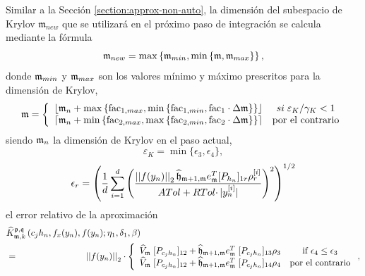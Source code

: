 Similar a la Sección \ref{section:approx-non-auto}, la dimensión del subespacio de Krylov $\mathfrak{m}_{new}$ que se utilizará en el próximo paso de integración se calcula mediante la fórmula
\begin{equation}\label{calcmnew-fj}
	\mathfrak{m}_{new}= \max\left\{ \mathfrak{m}_{min}, \min\left\{ \mathfrak{m} , \mathfrak{m}_{max}  \right\} \right\},
	\end{equation}
donde $\mathfrak{m}_{min}$ y $\mathfrak{m}_{max}$ son los valores mínimo y máximo prescritos para la dimensión de Krylov,
\begin{equation}
	\mathfrak{m} = \left\{
\begin{array}{cc}
\left\lfloor \mathfrak{m}_{n} + \max\left\{ \mathrm{fac}_{1,max} , \min\left\{ \mathrm{fac}_{1,min},
		\mathrm{fac}_1\cdot\Delta\mathfrak{m} \right\}  \right\} \right\rfloor & si \;  \varepsilon_{K}/\gamma_{K}< 1\\
\left\lceil \mathfrak{m}_{n} + \min\left\{ \mathrm{fac}_{2,max} , \max\left\{ \mathrm{fac}_{2,min},
		\mathrm{fac}_2\cdot\Delta\mathfrak{m} \right\}  \right\} \right\rceil  & \text{por el contrario}
\end{array}
\right. \label{m_unica}
\end{equation}
siendo $\mathfrak{m}_{n}$ la dimensión de Krylov  en el paso actual,
\begin{equation} \label{errrel-fj}
	\varepsilon_{K} = \min \{\epsilon _{3},\epsilon _{4}\},
	\end{equation}
	\begin{equation*}
	\epsilon_{r} = \left(\frac{1}{d}\sum\limits_{i=1}^{d} \left(\frac{\left\lvert \left\lvert f(y_n) \right\rvert \right\rvert_2
		\widehat{\mathfrak{h}}_{\mathfrak{m}+1,\mathfrak{m}} e_{\mathfrak{m}}^T
		[P_{h_n}]_{1r} \rho_r^{[i]}}{ATol+ RTol\cdotp
		\rvert y_{n}^{[i]}\rvert}\right)^{2}\right)^{1/2}
\end{equation*}
el error relativo de la aproximación
\begin{eqnarray}
	&\widehat{K}_{\mathfrak{m},k}^{\mathfrak{p},\mathfrak{q}}\left(
	c_{j}h_{n},f_{x}(y_{n}),f(y_{n});\eta _{1},\delta _{1},\beta \right) &
	\label{eq:adapt_gen_kp_aprox} \\
	&=& \hspace{-2.5cm}\nnorm{\nnorm{f(y_n)}}_2 \cdot\left\{
	\begin{array}{cc}
	\widehat{V}_{\mathfrak{m}}\;[P_{c_{j}h_n}]_{12}+
	\widehat{\mathfrak{h}}_{\mathfrak{m}+1,\mathfrak{m}}e_{\mathfrak{m}%
	}^{T}\;[P_{c_{j}h_n}]_{13}\rho _{3} & \text{if }\epsilon _{4}\leq \epsilon _{3}
	\\
	\widehat{V}_{\mathfrak{m}}\;[P_{c_{j}h_n}]_{12}+
	\widehat{\mathfrak{h}}_{\mathfrak{m}+1,\mathfrak{m}}e_{\mathfrak{m}%
	}^{T}\;[P_{c_{j}h_n}]_{14}\rho _{4} & \text{por el contrario}%
	\end{array}
	\right. ,  \notag
\end{eqnarray}
